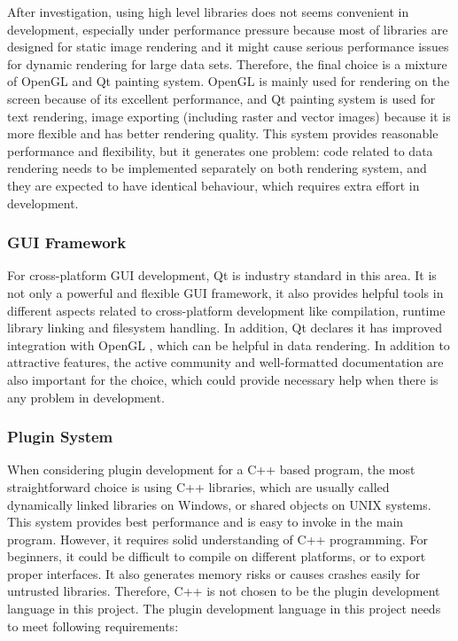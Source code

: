 After investigation, using high level libraries does not seems convenient in development, especially under performance pressure because most of libraries are designed for static image rendering and it might cause serious performance issues for dynamic rendering for large data sets. Therefore, the final choice is a mixture of OpenGL and Qt painting system. OpenGL is mainly used for rendering on the screen because of its excellent performance, and Qt painting system is used for text rendering, image exporting (including raster and vector images) because it is more flexible and has better rendering quality. This system provides reasonable performance and flexibility, but it generates one problem: code related to data rendering needs to be implemented separately on both rendering system, and they are expected to have identical behaviour, which requires extra effort in development.

\subsubsection{GUI Framework}

For cross-platform GUI development, Qt is industry standard in this area. It is not only a powerful and flexible GUI framework, it also provides helpful tools in different aspects related to cross-platform development like compilation, runtime library linking and filesystem handling. In addition, Qt declares it has improved integration with OpenGL \cite{ref:qtgui}, which can be helpful in data rendering. In addition to attractive features, the active community and well-formatted documentation are also important for the choice, which could provide necessary help when there is any problem in development.

\subsubsection{Plugin System}

When considering plugin development for a C++ based program, the most straightforward choice is using C++ libraries, which are usually called dynamically linked libraries on Windows, or shared objects on UNIX systems. This system provides best performance and is easy to invoke in the main program. However, it requires solid understanding of C++ programming. For beginners, it could be difficult to compile on different platforms, or to export proper interfaces. It also generates memory risks or causes crashes easily for untrusted libraries. Therefore, C++ is not chosen to be the plugin development language in this project. The plugin development language in this project needs to meet following requirements:

